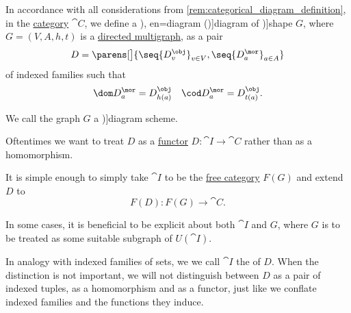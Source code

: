\begin{definition}\label{def:categorical_diagram}\mimprovised
  In accordance with all considerations from \cref{rem:categorical_diagram_definition}, in the \hyperref[def:category]{category} \( \cat{C} \), we define a \term[ru=диаграмма (\cite[50]{Хелемский2014ФункциональныйАнализ}), en=diagram (\cite[51]{MacLane1998CategoryTheory})]{diagram} of \term[en=shape (\cite[51]{MacLane1998CategoryTheory})]{shape} \( G \), where \( G = (V, A, h, t) \) is a \hyperref[def:directed_multigraph]{directed multigraph}, as a pair
  \begin{equation*}
    D = \parens[\big]{ \seq{ D_v^{\obj} }_{v \in V}, \seq{ D_a^{\mor} }_{a \in A} }
  \end{equation*}
  of indexed families such that
  \begin{align*}
    \dom D_a^{\mor} = D_{h(a)}^{\obj} && \cod D_a^{\mor} = D_{t(a)}^{\obj}.
  \end{align*}

  We call the graph \( G \) a \term[en=diagram scheme (\cite[48]{MacLane1998CategoryTheory})]{diagram scheme}.

  \begin{thmenum}
     Oftentimes we want to treat \( D \) as a \hyperref[def:functor]{functor} \( D: \cat{I} \to \cat{C} \) rather than as a homomorphism.

    It is simple enough to simply take \( \cat{I} \) to be the \hyperref[def:free_category]{free category} \( F(G) \) and extend \( D \) to
    \begin{equation*}
      F(D): F(G) \to \cat{C}.
    \end{equation*}

    In some cases, it is beneficial to be explicit about both \( \cat{I} \) and \( G \), where \( G \) is to be treated as some suitable subgraph of \( U(\cat{I}) \).

    In analogy with indexed families of sets, we we call \( \cat{I} \) the  of \( D \). When the distinction is not important, we will not distinguish between \( D \) as a pair of indexed tuples, as a homomorphism and as a functor, just like we conflate indexed families and the functions they induce.


\end{thmenum}
\end{definition}
